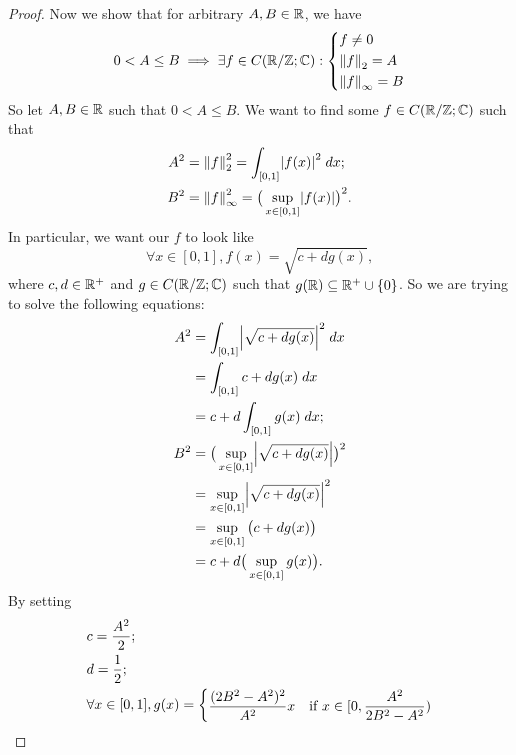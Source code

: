 \begin{proof}
  Now we show that for arbitrary \(A, B \in \R\), we have
  \[
    0 < A \leq B \implies \exists f \in C(\R / \Z ; \C) : \begin{dcases}
      f \neq 0        \\
      \norm*{f}_2 = A \\
      \norm*{f}_{\infty} = B
    \end{dcases}
  \]
  So let \(A, B \in \R\) such that \(0 < A \leq B\).
  We want to find some \(f \in C(\R / \Z ; \C)\) such that
  \begin{align*}
    A^2 & = \norm*{f}_2^2 = \int_{[0, 1]} \abs{f(x)}^2 \; dx;                  \\
    B^2 & = \norm*{f}_{\infty}^2 = \big(\sup_{x \in [0, 1]} \abs{f(x)}\big)^2.
  \end{align*}
  In particular, we want our \(f\) to look like
  \[
    \forall x \in [0, 1], f(x) = \sqrt{c + d g(x)},
  \]
  where \(c, d \in \R^+\) and \(g \in C(\R / \Z ; \C)\) such that \(g(\R) \subseteq \R^+ \cup \set{0}\).
  So we are trying to solve the following equations:
  \begin{align*}
    A^2 & = \int_{[0, 1]} \abs{\sqrt{c + dg(x)}}^2 \; dx           \\
        & = \int_{[0, 1]} c + dg(x) \; dx                          \\
        & = c + d \int_{[0, 1]} g(x) \; dx;                        \\
    B^2 & = \big(\sup_{x \in [0, 1]} \abs{\sqrt{c + dg(x)}}\big)^2 \\
        & = \sup_{x \in [0, 1]} \abs{\sqrt{c + dg(x)}}^2           \\
        & = \sup_{x \in [0, 1]} \big(c + dg(x)\big)                \\
        & = c + d \big(\sup_{x \in [0, 1]} g(x)\big).
  \end{align*}
  By setting
  \begin{align*}
     & c = \dfrac{A^2}{2};                                                                                                                                      \\
     & d = \dfrac{1}{2};                                                                                                                                        \\
     & \forall x \in [0, 1], g(x) = \begin{dcases}
                                      \dfrac{(2 B^2 - A^2)^2}{A^2} x                    & \text{if } x \in [0, \dfrac{A^2}{2 B^2 - A^2})                          \\

\end{dcases}
\end{align*}
\end{proof}
